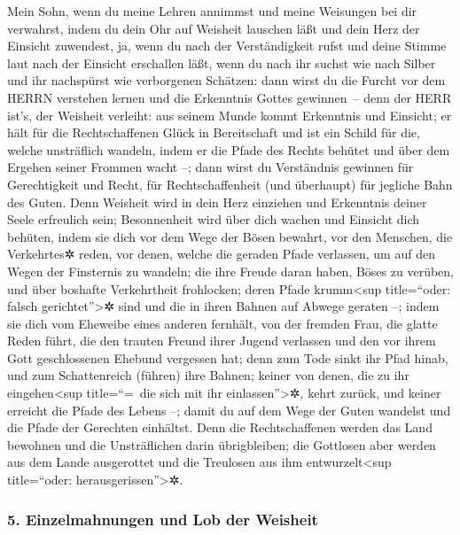 Mein Sohn, wenn du meine Lehren annimmst und meine
Weisungen bei dir verwahrst, indem du dein Ohr auf
Weisheit lauschen läßt und dein Herz der Einsicht zuwendest,
ja, wenn du nach der Verständigkeit rufst und deine Stimme
laut nach der Einsicht erschallen läßt, wenn du nach ihr
suchst wie nach Silber und ihr nachspürst wie verborgenen Schätzen:
dann wirst du die Furcht vor dem HERRN verstehen lernen
und die Erkenntnis Gottes gewinnen~-- denn der HERR ist's,
der Weisheit verleiht: aus seinem Munde kommt Erkenntnis und Einsicht;
er hält für die Rechtschaffenen Glück in Bereitschaft und
ist ein Schild für die, welche unsträflich wandeln, indem
er die Pfade des Rechts behütet und über dem Ergehen seiner Frommen
wacht --; dann wirst du Verständnis gewinnen für
Gerechtigkeit und Recht, für Rechtschaffenheit (und überhaupt) für
jegliche Bahn des Guten. Denn Weisheit wird in dein Herz
einziehen und Erkenntnis deiner Seele erfreulich sein;
Besonnenheit wird über dich wachen und Einsicht dich
behüten, indem sie dich vor dem Wege der Bösen bewahrt,
vor den Menschen, die Verkehrtes✲ reden, vor denen,
welche die geraden Pfade verlassen, um auf den Wegen der Finsternis zu
wandeln; die ihre Freude daran haben, Böses zu verüben,
und über boshafte Verkehrtheit frohlocken; deren Pfade
krumm\textless sup title=``oder: falsch gerichtet''\textgreater✲ sind
und die in ihren Bahnen auf Abwege geraten --; indem sie
dich vom Eheweibe eines anderen fernhält, von der fremden Frau, die
glatte Reden führt, die den trauten Freund ihrer Jugend
verlassen und den vor ihrem Gott geschlossenen Ehebund vergessen hat;
denn zum Tode sinkt ihr Pfad hinab, und zum Schattenreich
(führen) ihre Bahnen; keiner von denen, die zu ihr
eingehen\textless sup title=``=~die sich mit ihr
einlassen''\textgreater✲, kehrt zurück, und keiner erreicht die Pfade
des Lebens --; damit du auf dem Wege der Guten wandelst
und die Pfade der Gerechten einhältst. Denn die
Rechtschaffenen werden das Land bewohnen und die Unsträflichen darin
übrigbleiben; die Gottlosen aber werden aus dem Lande
ausgerottet und die Treulosen aus ihm entwurzelt\textless sup
title=``oder: herausgerissen''\textgreater✲.

\hypertarget{einzelmahnungen-und-lob-der-weisheit}{%
\subsubsection{5. Einzelmahnungen und Lob der
Weisheit}\label{einzelmahnungen-und-lob-der-weisheit}}

